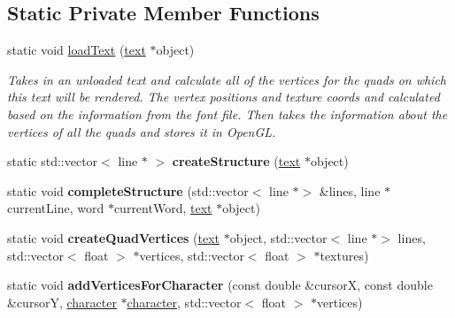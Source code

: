 \subsection*{Static Private Member Functions}
\begin{DoxyCompactItemize}
\item 
static void \hyperlink{classflounder_1_1text_aa5fea613182b186ca1c7b52900378e03}{load\+Text} (\hyperlink{classflounder_1_1text}{text} $\ast$object)
\begin{DoxyCompactList}\small\item\em Takes in an unloaded text and calculate all of the vertices for the quads on which this text will be rendered. The vertex positions and texture coords and calculated based on the information from the font file. Then takes the information about the vertices of all the quads and stores it in Open\+GL. \end{DoxyCompactList}\item 
\mbox{\label{classflounder_1_1text_ac76703f9a2b6be0ce073f0f3fe4d59d3}} 
static std\+::vector$<$ line $\ast$ $>$ {\bfseries create\+Structure} (\hyperlink{classflounder_1_1text}{text} $\ast$object)
\item 
\mbox{\label{classflounder_1_1text_a926f4d1af6eaa7e2f5559a9a650db49d}} 
static void {\bfseries complete\+Structure} (std\+::vector$<$ line $\ast$$>$ \&lines, line $\ast$current\+Line, word $\ast$current\+Word, \hyperlink{classflounder_1_1text}{text} $\ast$object)
\item 
\mbox{\label{classflounder_1_1text_aa424226c2bd3404c173543a29a4bf2d0}} 
static void {\bfseries create\+Quad\+Vertices} (\hyperlink{classflounder_1_1text}{text} $\ast$object, std\+::vector$<$ line $\ast$$>$ lines, std\+::vector$<$ float $>$ $\ast$vertices, std\+::vector$<$ float $>$ $\ast$textures)
\item 
\mbox{\label{classflounder_1_1text_ab0f58730a8d2d52f73d86cfd85ec3ed9}} 
static void {\bfseries add\+Vertices\+For\+Character} (const double \&cursorX, const double \&cursorY, \hyperlink{classflounder_1_1character}{character} $\ast$\hyperlink{classflounder_1_1character}{character}, std\+::vector$<$ float $>$ $\ast$vertices)
\item 
\mbox{\label{classflounder_1_1text_ab3a32d76f07d67abc5bab55a926d0877}} 

\end{DoxyCompactItemize}
